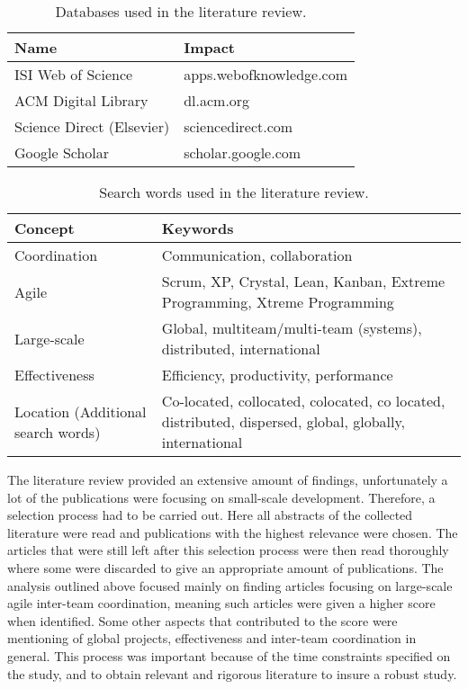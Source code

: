 \begin{table}[H]
\begin{center}
    \begin{tabular}{ | p{5cm} | p{8cm} |}
    \hline
    \textbf{Name} & \textbf{Impact} \\ \hline
    ISI Web of Science & apps.webofknowledge.com \\ \hline
    ACM Digital Library & dl.acm.org  \\ \hline
    Science Direct (Elsevier) & sciencedirect.com \\ \hline
    Google Scholar & scholar.google.com \\ \hline
    \end{tabular}
    \caption{Databases used in the literature review.}
    \label{databases}
\end{center}
\end{table}

\begin{table}[H]
\begin{center}
    \begin{tabular}{ | p{5cm} | p{8cm} |}
    \hline
    \textbf{Concept} & \textbf{Keywords} \\ \hline
    Coordination & Communication, collaboration \\ \hline
    Agile & Scrum, XP, Crystal, Lean, Kanban, Extreme Programming, Xtreme Programming  \\ \hline
    Large-scale & Global, multiteam/multi-team (systems), distributed, international \\ \hline
    Effectiveness & Efficiency, productivity, performance \\ \hline
    Location (Additional search words) & Co-located, collocated, colocated, co located, distributed, dispersed, global, globally, international  \\ \hline
    \end{tabular}
    \caption{Search words used in the literature review.}
    \label{searchwords}
\end{center}
\end{table}

The literature review provided an extensive amount of findings, unfortunately a lot of the publications were focusing on small-scale development. Therefore, a selection process had to be carried out. Here all abstracts of the collected literature were read and publications with the highest relevance were chosen. The articles that were still left after this selection process were then read thoroughly where some were discarded to give an appropriate amount of publications. The analysis outlined above focused mainly on finding articles focusing on large-scale agile inter-team coordination, meaning such articles were given a higher score when identified. Some other aspects that contributed to the score were mentioning of global projects, effectiveness and inter-team coordination in general. This process was important because of the time constraints specified on the study, and to obtain relevant and rigorous literature to insure a robust study.

